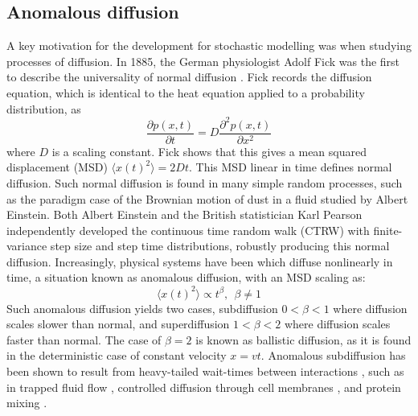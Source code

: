\subsection{Anomalous diffusion}\label{subsec:anom_diff}
A key motivation for the development for stochastic modelling was when studying processes of diffusion. In 1885, the German physiologist Adolf Fick was the first to describe the universality of normal diffusion \cite{klafter_anomalous_2005}. Fick records the diffusion equation, which is identical to the heat equation applied to a probability distribution, as
\begin{equation}
    \frac{\partial p(x,t)}{\partial t} = D \frac{\partial ^2 p(x,t)}{\partial x ^2}
\end{equation}
where $D$ is a scaling constant. Fick shows that this gives a mean squared displacement (MSD) $\langle x(t)^2 \rangle = 2Dt$. This MSD linear in time defines normal diffusion. Such normal diffusion is found in many simple random processes, such as the paradigm case of the Brownian motion of dust in a fluid studied by Albert Einstein. Both Albert Einstein and the British statistician Karl Pearson independently developed the continuous time random walk (CTRW) with finite-variance step size and step time distributions, robustly producing this normal diffusion. Increasingly, physical systems have been which diffuse nonlinearly in time, a situation known as anomalous diffusion, with an MSD scaling as:
\begin{equation}
    \langle x(t) ^2 \rangle \propto t^{\beta}, \ \ \beta \neq 1
\end{equation}
Such anomalous diffusion yields two cases, subdiffusion $0 < \beta < 1$ where diffusion scales slower than normal, and superdiffusion $1 < \beta < 2$ where diffusion scales faster than normal. The case of $\beta = 2$ is known as ballistic diffusion, as it is found in the deterministic case of constant velocity $x = vt$. Anomalous subdiffusion has been shown to result from heavy-tailed wait-times between interactions \cite{klafter_anomalous_2005}, such as in trapped fluid flow \cite{Kirchner2000-kf}, controlled diffusion through cell membranes \cite{klafter_anomalous_2005}, and protein mixing \cite{Kou2004-kz}. \\

